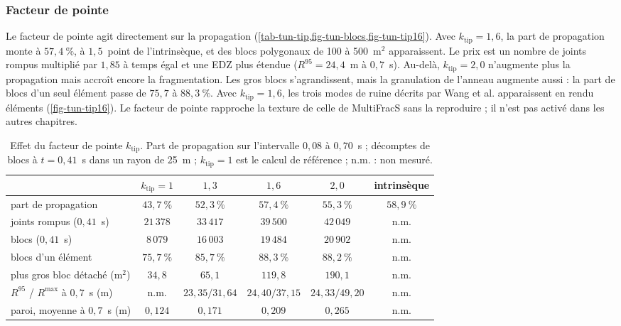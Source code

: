 \subsubsection{Facteur de pointe}

Le facteur de pointe agit directement sur la propagation (\cref{tab-tun-tip,fig-tun-blocs,fig-tun-tip16}). Avec $k_\text{tip} = 1{,}6$, la part de propagation monte à $57{,}4~\%$, à $1{,}5$~point de l'intrinsèque, et des blocs polygonaux de 100 à 500~m$^2$ apparaissent. Le prix est un nombre de joints rompus multiplié par $1{,}85$ à temps égal et une EDZ plus étendue ($R^{95} = 24{,}4$~m à $0{,}7$~s). Au-delà, $k_\text{tip} = 2{,}0$ n'augmente plus la propagation mais accroît encore la fragmentation. Les gros blocs s'agrandissent, mais la granulation de l'anneau augmente aussi : la part de blocs d'un seul élément passe de $75{,}7$ à $88{,}3~\%$. Avec $k_\text{tip} = 1{,}6$, les trois modes de ruine décrits par Wang et al. apparaissent en rendu éléments (\cref{fig-tun-tip16}). Le facteur de pointe rapproche la texture de celle de MultiFracS sans la reproduire ; il n'est pas activé dans les autres chapitres.

\begin{table}[htbp]
\centering
\caption{Effet du facteur de pointe $k_\text{tip}$. Part de propagation sur l'intervalle $0{,}08$ à $0{,}70$~s ; décomptes de blocs à $t = 0{,}41$~s dans un rayon de 25~m ; $k_\text{tip} = 1$ est le calcul de référence ; n.m. : non mesuré.}
\label{tab-tun-tip}
\small
\begin{tabular}{@{}lccccc@{}}
\toprule
 & $k_\text{tip} = 1$ & $1{,}3$ & $1{,}6$ & $2{,}0$ & intrinsèque \\
\midrule
part de propagation & $43{,}7~\%$ & $52{,}3~\%$ & $57{,}4~\%$ & $55{,}3~\%$ & $58{,}9~\%$ \\
joints rompus ($0{,}41$~s) & $21\,378$ & $33\,417$ & $39\,500$ & $42\,049$ & n.m. \\
blocs ($0{,}41$~s) & $8\,079$ & $16\,003$ & $19\,484$ & $20\,902$ & n.m. \\
blocs d'un élément & $75{,}7~\%$ & $85{,}7~\%$ & $88{,}3~\%$ & $88{,}2~\%$ & n.m. \\
plus gros bloc détaché (m$^2$) & $34{,}8$ & $65{,}1$ & $119{,}8$ & $190{,}1$ & n.m. \\
$R^{95}$ / $R^\text{max}$ à $0{,}7$~s (m) & n.m. & $23{,}35 / 31{,}64$ & $24{,}40 / 37{,}15$ & $24{,}33 / 49{,}20$ & n.m. \\
paroi, moyenne à $0{,}7$~s (m) & $0{,}124$ & $0{,}171$ & $0{,}209$ & $0{,}265$ & n.m. \\
\bottomrule
\end{tabular}
\end{table}

